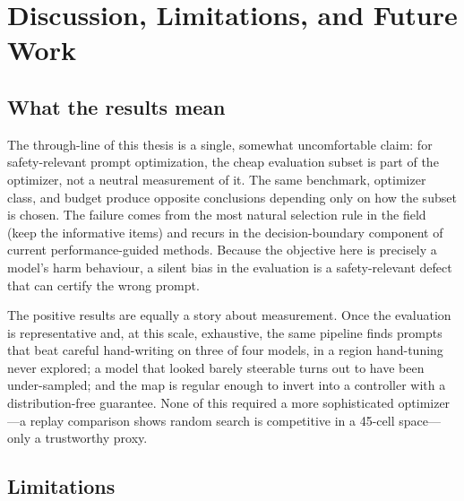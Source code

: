 \chapter{Discussion, Limitations, and Future Work}
\label{ch:discussion}

\section{What the results mean}

The through-line of this thesis is a single, somewhat uncomfortable claim: for safety-relevant
prompt optimization, the cheap evaluation subset is part of the optimizer, not a neutral
measurement of it. The same benchmark, optimizer class, and budget produce opposite conclusions
depending only on how the subset is chosen. The failure comes from the most natural selection
rule in the field (keep the informative items) and recurs in the decision-boundary component of
current performance-guided methods. Because the objective here is precisely a model's harm
behaviour, a silent bias in the evaluation is a safety-relevant defect that can certify the
wrong prompt.

The positive results are equally a story about measurement. Once the evaluation is
representative and, at this scale, exhaustive, the same pipeline finds prompts that beat careful
hand-writing on three of four models, in a region hand-tuning never explored; a model that
looked barely steerable turns out to have been under-sampled; and the map is regular enough to
invert into a controller with a distribution-free guarantee. None of this required a more
sophisticated optimizer---a replay comparison shows random search is competitive in a 45-cell
space---only a trustworthy proxy.

\section{Limitations}

